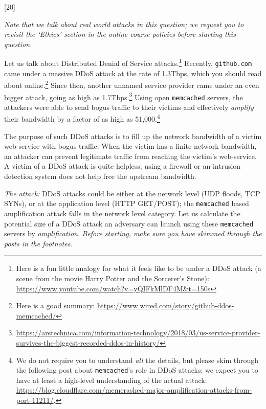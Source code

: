 \documentclass[12pt]{exam}
\begin{document}
\begin{Form}
\begin{questions}
\begin{parts}
\end{parts}

\newpage
{}[20] 

\textit{Note that we talk about real world attacks in this question; we request
  you to revisit the `Ethics' section in the online course policies before 
  starting this question.}

Let us talk about Distributed Denial of Service attacks.\footnote{Here is a fun
little analogy for what it feels like to be under a DDoS attack (a scene from
the movie Harry Potter and the Sorcerer's Stone):
\href{https://www.youtube.com/watch?v=yQIFkMlDF4M\&t=150s}{https://www.youtube.com/watch?v=yQIFkMlDF4M\&t=150s}}
Recently, \texttt{github.com} came under a massive DDoS attack at the rate of
1.3Tbps, which you should read about online.\footnote{Here is a good summary:
\href{https://www.wired.com/story/github-ddos-memcached/}{https://www.wired.com/story/github-ddos-memcached/}}
Since then, another unnamed service provider came under an even bigger
attack, going as high as
1.7Tbps.\footnote{\href{https://arstechnica.com/information-technology/2018/03/us-service-provider-survives-the-biggest-recorded-ddos-in-history/}{https://arstechnica.com/information-technology/2018/03/us-service-provider-survives-the-biggest-recorded-ddos-in-history/}}
Using open \texttt{memcached} servers, the attackers were able to send bogus
traffic to their victims and effectively \emph{amplify} their bandwidth by a
factor of as high as 51,000.\footnote{ We do not require you to understand
\emph{all} the details, but please skim through the following post about
\texttt{memcached}'s role in DDoS attacks; we expect you to have at least a
high-level understanding of the actual attack:
\href{https://blog.cloudflare.com/memcrashed-major-amplification-attacks-from-port-11211/}{https://blog.cloudflare.com/memcrashed-major-amplification-attacks-from-port-11211/}.

}

The purpose of such DDoS attacks is to fill up the network bandwidth of a victim
web-service with bogus traffic. When the victim has a finite network bandwidth,
an attacker can prevent legitimate traffic from reaching the victim's
web-service. A victim of a DDoS attack is quite helpless; using a firewall or an intrusion detection system does not help free the upstream bandwidth.

\textit{The attack:} DDoS attacks could be either at the network level (UDP
floods, TCP SYNs), or at the application level (HTTP GET/POST); the
\texttt{memcached} based amplification attack falls in the network level
category. Let us calculate the potential size of a DDoS attack an adversary can
launch using these \texttt{memcached} servers by \emph{amplification}.
\emph{Before starting, make sure you have skimmed through the posts in the
footnotes.}



\end{questions}
\end{Form}
\end{document}
